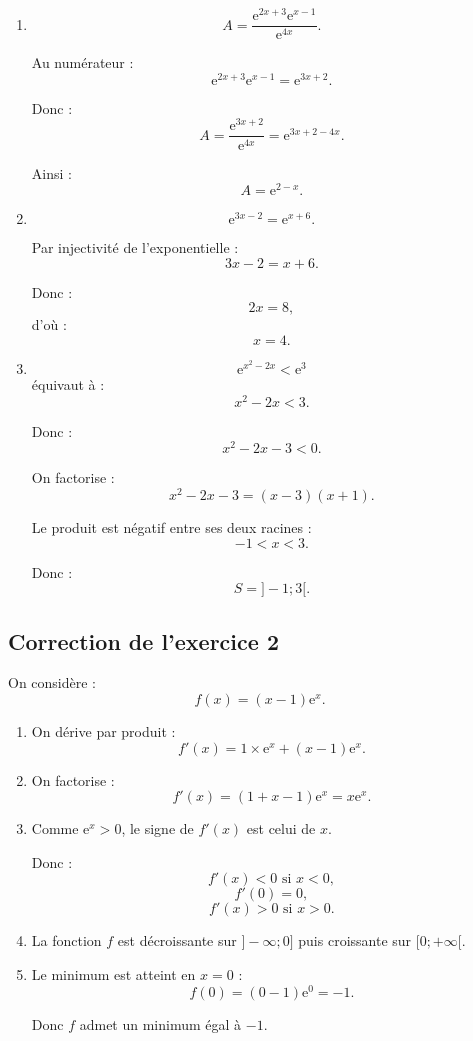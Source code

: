 \documentclass[11pt,a4paper]{article}
\newcommand{\e}{\mathrm{e}}
\begin{document}
\begin{enumerate}
    \item
    \[
    A=\frac{\e^{2x+3}\e^{x-1}}{\e^{4x}}.
    \]

    Au numérateur :
    \[
    \e^{2x+3}\e^{x-1}=\e^{3x+2}.
    \]

    Donc :
    \[
    A=\frac{\e^{3x+2}}{\e^{4x}}=\e^{3x+2-4x}.
    \]

    Ainsi :
    \[
    A=\e^{2-x}.
    \]

    \item
    \[
    \e^{3x-2}=\e^{x+6}.
    \]

    Par injectivité de l'exponentielle :
    \[
    3x-2=x+6.
    \]

    Donc :
    \[
    2x=8,
    \]
    d'où :
    \[
    x=4.
    \]

    \item
    \[
    \e^{x^2-2x}<\e^3
    \]
    équivaut à :
    \[
    x^2-2x<3.
    \]

    Donc :
    \[
    x^2-2x-3<0.
    \]

    On factorise :
    \[
    x^2-2x-3=(x-3)(x+1).
    \]

    Le produit est négatif entre ses deux racines :
    \[
    -1<x<3.
    \]

    Donc :
    \[
    S=]-1;3[.
    \]
\end{enumerate}

\subsection*{Correction de l'exercice 2}

On considère :
\[
f(x)=(x-1)\e^x.
\]

\begin{enumerate}
    \item On dérive par produit :
    \[
    f'(x)=1\times \e^x+(x-1)\e^x.
    \]

    \item On factorise :
    \[
    f'(x)=\left(1+x-1\right)\e^x=x\e^x.
    \]

    \item Comme $\e^x>0$, le signe de $f'(x)$ est celui de $x$.

    Donc :
    \[
    f'(x)<0 \text{ si } x<0,
    \]
    \[
    f'(0)=0,
    \]
    \[
    f'(x)>0 \text{ si } x>0.
    \]

    \item La fonction $f$ est décroissante sur $]-\infty;0]$ puis croissante sur $[0;+\infty[$.

    \item Le minimum est atteint en $x=0$ :
    \[
    f(0)=(0-1)\e^0=-1.
    \]

    Donc $f$ admet un minimum égal à $-1$.
\end{enumerate}
\end{document}
